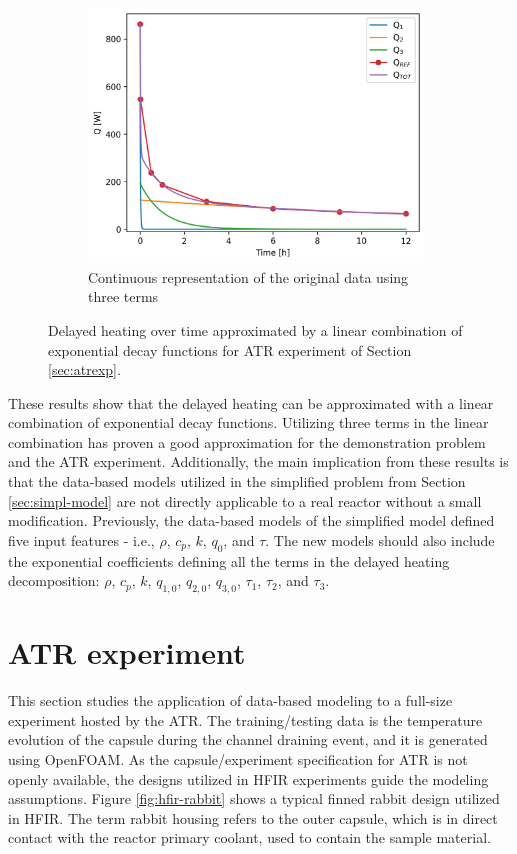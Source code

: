 \begin{figure}[htbp!]
\begin{subfigure}[b]{0.48\textwidth}
    \centering
    \includegraphics[width=0.98\textwidth]{figures/atr-13-deco-2}
    \caption{Continuous representation of the original data using three terms}
    \label{fig:modes-atr-c}
  \end{subfigure}
  \caption{Delayed heating over time approximated by a linear combination of exponential decay functions for ATR experiment of Section \ref{sec:atrexp}.}
  \label{fig:modes-atr}
\end{figure}

These results show that the delayed heating can be approximated with a linear combination of exponential decay functions.
Utilizing three terms in the linear combination has proven a good approximation for the demonstration problem and the ATR experiment.
Additionally, the main implication from these results is that the data-based models utilized in the simplified problem from Section \ref{sec:simpl-model} are not directly applicable to a real reactor without a small modification.
Previously, the data-based models of the simplified model defined five input features - i.e., $\rho$, $c_p$, $k$, $q_0$, and $\tau$.
The new models should also include the exponential coefficients defining all the terms in the delayed heating decomposition: $\rho$, $c_p$, $k$, $q_{1,0}$, $q_{2,0}$, $q_{3,0}$, $\tau_1$, $\tau_2$, and $\tau_3$.


\section{ATR experiment}
\label{sec:atr}

This section studies the application of data-based modeling to a full-size experiment hosted by the ATR.
The training/testing data is the temperature evolution of the capsule during the channel draining event, and it is generated using OpenFOAM.
As the capsule/experiment specification for ATR is not openly available, the designs utilized in \gls*{HFIR} experiments guide the modeling assumptions.
Figure \ref{fig:hfir-rabbit} shows a typical finned rabbit design utilized in HFIR.
The term rabbit housing refers to the outer capsule, which is in direct contact with the reactor primary coolant, used to contain the sample material.


